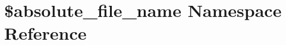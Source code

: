 \section{\$absolute\+\_\+file\+\_\+name Namespace Reference}
\label{namespace_0Babsolute__file__name}
